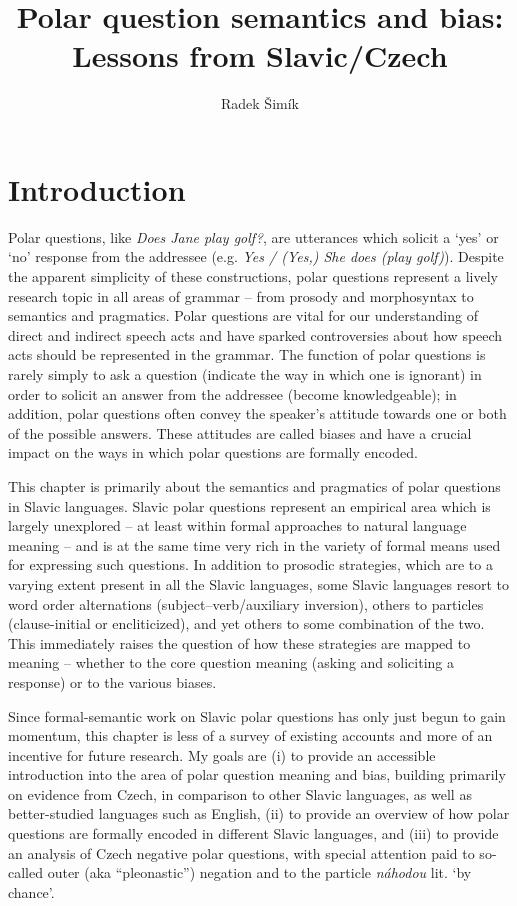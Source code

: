 \documentclass[output=paper,colorlinks,citecolor=brown]{langscibook}
\author{Radek Šimík\orcid{0000-0002-4736-195X}\affiliation{Charles University}}
\title{Polar question semantics and bias: Lessons from Slavic/Czech}
\begin{document}
\maketitle

\section{Introduction}\label{sim:sec:pre-intro}

Polar questions, like \textit{Does Jane play golf?}, are utterances which solicit a `yes' or `no' response from the addressee (e.g. \textit{Yes / (Yes,) She does (play golf)}). Despite the apparent simplicity of these constructions, polar questions represent a lively research topic in all areas of grammar -- from prosody and morphosyntax to semantics and pragmatics. Polar questions are vital for our understanding of direct and indirect speech acts and have sparked controversies about how speech acts should be represented in the grammar. The function of polar questions is rarely simply to ask a question (indicate the way in which one is ignorant) in order to solicit an answer from the addressee (become knowledgeable); in addition, polar questions often convey the speaker's attitude towards one or both of the possible answers. These attitudes are called biases and have a crucial impact on the ways in which polar questions are formally encoded.

This chapter is primarily about the semantics and pragmatics of polar questions in Slavic languages. Slavic polar questions represent an empirical area which is largely unexplored -- at least within formal approaches to natural language meaning -- and is at the same time very rich in the variety of formal means used for expressing such questions. In addition to prosodic strategies, which are to a varying extent present in all the Slavic languages, some Slavic languages resort to word order alternations (subject--verb/auxiliary inversion), others to particles (clause-initial or encliticized), and yet others to some combination of the two. This immediately raises the question of how these strategies are mapped to meaning -- whether to the core question meaning (asking and soliciting a response) or to the various biases.

Since formal-semantic work on Slavic polar questions has only just begun to gain momentum, this chapter is less of a survey of existing accounts and more of an incentive for future research. My goals are (i) to provide an accessible introduction into the area of polar question meaning and bias, building primarily on evidence from Czech, in comparison to other Slavic languages, as well as better-studied languages such as English, (ii) to provide an overview of how polar questions are formally encoded in different Slavic languages, and (iii) to provide an analysis of Czech negative polar questions, with special attention paid to so-called outer (aka ``pleonastic'') negation and to the particle \textit{náhodou} lit. `by chance'.
\end{document}
